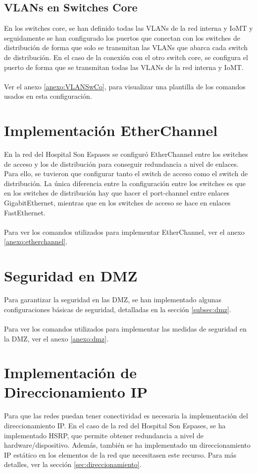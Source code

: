 \subsection{VLANs en Switches Core}
En los switches core, se han definido todas las VLANs de la red interna y IoMT y seguidamente se han configurado los puertos que conectan con los switches de distribución de forma que solo se transmitan las VLANs que abarca cada switch de distribución. En el caso de
la conexión con el otro switch core, se configura el puerto de forma que se transmitan todas las VLANs de la red interna y IoMT.
\\ \\
Ver el anexo \ref{anexo:VLANSwCo}, para visualizar una plantilla de los comandos usados en esta configuración.

\section{Implementación EtherChannel}
En la red del Hospital Son Espases se configuró EtherChannel entre los switches de acceso y los de distribución para conseguir redundancia a nivel de enlaces. Para ello, se tuvieron 
que configurar tanto el switch de acceso como el switch de distribución. La única diferencia entre la configuración entre los switches es que en los switches de distribución hay que hacer el port-channel entre enlaces GigabitEthernet, mientras 
que en los switches de acceso se hace en enlaces FastEthernet.
\\ \\
Para ver los comandos utilizados para implementar EtherChannel, ver el anexo \ref{anexo:etherchannel}.

\section{Seguridad en DMZ}
Para garantizar la seguridad en las DMZ, se han implementado algunas configuraciones básicas de seguridad, detalladas en la sección \ref{subsec:dmz}.
\\ \\
Para ver los comandos utilizados para implementar las medidas de seguridad en la DMZ, ver el anexo \ref{anexo:dmz}.

\section{Implementación de Direccionamiento IP}
Para que las redes puedan tener conectividad es necesaria la implementación del direccionamiento IP. En el caso de la red del Hospital Son Espases, se ha implementado HSRP, que permite obtener redundancia a nivel de hardware/dispositivo.
Además, también se ha implementado un direccionamiento IP estático en los elementos de la red que necesitasen este recurso. Para más detalles, ver la sección \ref{sec:direccionamiento}.
